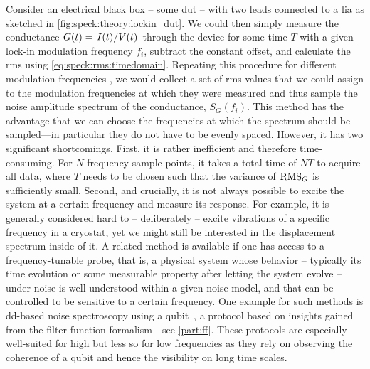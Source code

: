 Consider an electrical black box -- some \acrfull{dut} -- with two leads connected to a \acrfull{lia} as sketched in \cref{fig:speck:theory:lockin_dut}.
We could then simply measure the conductance $G(t) = \flatfrac{I(t)}{V(t)}$ through the device for some time $T$ with a given lock-in modulation frequency $f_i$, subtract the constant offset,
and calculate the \gls{rms} using \cref{eq:speck:rms:timedomain}.
Repeating this procedure for different modulation frequencies , we would collect a set of \gls{rms}-values that we could assign to the modulation frequencies at which they were measured and thus sample the noise amplitude spectrum
of the conductance, $S_G(f_i)$.
This method has the advantage that we can choose the frequencies at which the spectrum should be sampled---in particular they do not have to be evenly spaced.
However, it has two significant shortcomings.
First, it is rather inefficient and therefore time-consuming.
For $N$ frequency sample points, it takes a total time of $NT$ to acquire all data, where $T$ needs to be chosen such that the variance of $\operatorname{RMS}_G$ is sufficiently small.
Second, and crucially, it is not always possible to excite the system at a certain frequency and measure its response.
For example, it is generally considered hard
to -- deliberately -- excite vibrations of a specific frequency in a cryostat, yet we might still be interested in the displacement spectrum inside of it.
A related method is available if one has access to a frequency-tunable probe, that is, a physical system whose behavior -- typically its time evolution or some measurable property after letting the system evolve -- under noise is well understood within a given noise model, and that can be controlled to be sensitive to a certain frequency.
One example for such methods is \gls{dd}-based noise spectroscopy using a qubit~\cite{Alvarez2011,Szankowski2017,Dial2013,Connors2022}, a protocol based on insights gained from the filter-function formalism---see \cref{part:ff}.
These protocols are especially well-suited for high but less so for low frequencies as they rely on observing the coherence of a qubit and hence the visibility on long time scales.

